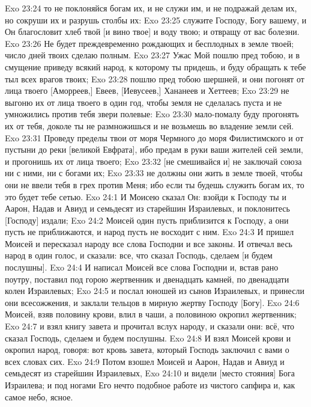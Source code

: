 \vs Exo 23:24 то не поклоняйся богам их, и не служи им, и не подражай делам их, но сокруши их и разрушь столбы их:
\rsbpar\vs Exo 23:25 служите Господу, Богу вашему, и Он благословит хлеб твой [и вино твое] и воду твою; и отвращу от вас болезни.
\vs Exo 23:26 Не будет преждевременно рождающих и бесплодных в земле твоей; число дней твоих сделаю полным.
\vs Exo 23:27 Ужас Мой пошлю пред тобою, и в смущение приведу всякий народ, к которому ты придешь, и буду обращать к тебе тыл всех врагов твоих;
\vs Exo 23:28 пошлю пред тобою шершней, и они погонят от лица твоего [Аморреев,] Евеев, [Иевусеев,] Хананеев и Хеттеев;
\vs Exo 23:29 не выгоню их от лица твоего в один год, чтобы земля не сделалась пуста и не умножились против тебя звери полевые:
\vs Exo 23:30 мало-помалу буду прогонять их от тебя, доколе ты не размножишься и не возьмешь во владение земли сей.
\vs Exo 23:31 Проведу пределы твои от моря Чермного до моря Филистимского и от пустыни до реки [великой Евфрата], ибо предам в руки ваши жителей сей земли, и прогонишь их от лица твоего;
\vs Exo 23:32 [не смешивайся и] не заключай союза ни с ними, ни с богами их;
\vs Exo 23:33 не должны они жить в земле твоей, чтобы они не ввели тебя в грех против Меня; ибо если ты будешь служить богам их, то это будет тебе сетью.
\vs Exo 24:1 И Моисею сказал Он: взойди к Господу ты и Аарон, Надав и Авиуд и семьдесят из старейшин Израилевых, и поклонитесь [Господу] издали;
\vs Exo 24:2 Моисей один пусть приблизится к Господу, а они пусть не приближаются, и народ пусть не восходит с ним.
\rsbpar\vs Exo 24:3 И пришел Моисей и пересказал народу все слова Господни и все законы. И отвечал весь народ в один голос, и сказали: все, что сказал Господь, сделаем [и будем послушны].
\rsbpar\vs Exo 24:4 И написал Моисей все слова Господни и, встав рано поутру, поставил под горою жертвенник и двенадцать камней, по  двенадцати колен Израилевых;
\vs Exo 24:5 и послал юношей из сынов Израилевых, и принесли они всесожжения, и заклали тельцов в мирную жертву Господу [Богу].
\vs Exo 24:6 Моисей, взяв половину крови, влил в чаши, а  половиною окропил жертвенник;
\vs Exo 24:7 и взял книгу завета и прочитал вслух народу, и сказали они: всё, что сказал Господь, сделаем и будем послушны.
\vs Exo 24:8 И взял Моисей крови и окропил народ, говоря: вот кровь завета, который Господь заключил с вами о всех словах сих.
\rsbpar\vs Exo 24:9 Потом взошел Моисей и Аарон, Надав и Авиуд и семьдесят из старейшин Израилевых,
\vs Exo 24:10 и видели [место стояния] Бога Израилева; и под ногами Его нечто подобное работе из чистого сапфира и, как самое небо, ясное.
